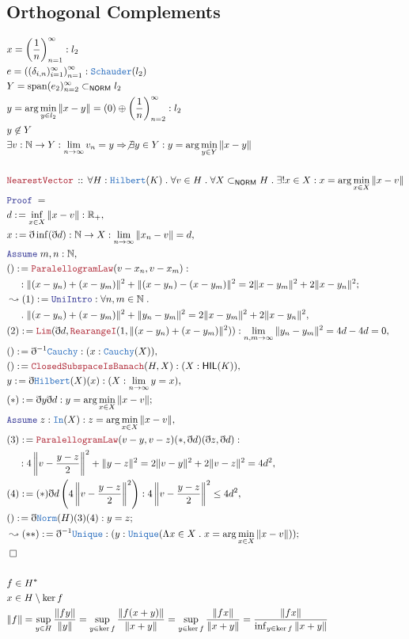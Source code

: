 \documentclass[12pt]{scrartcl}
\newcommand{\TYPE}[1]{\textcolor{NavyBlue}{\mathtt{#1}}}
\newcommand{\LOGIC}[1]{\textcolor{Blue}{\mathtt{#1}}}
\newcommand{\THM}[1]{\textcolor{Maroon}{\mathtt{#1}}}
\renewcommand{\.}{\; . \;}
\newcommand{\de}{: \kern 0.1pc =}
\newcommand{\Theorem}[2]{& \THM{#1} \, :: \, #2 \\ & \Proof = \\ }
\newcommand{\NewLine}{\\ & \kern 1pc}
\newcommand{\Page}[1]{\begin{align*} #1 \end{align*} \newpage   }
\newcommand{ \bd }{ \ByDef }
\newcommand{\Reals}{\mathbb{R} }
\newcommand{\Nat}{\mathbb{N} }
\newcommand{\Say}[3]{& #1 \de #2 : #3, \\}
\newcommand{\Conclude}[3]{& #1 \de #2 : #3; \\}
\newcommand{\Derive}[3]{& \leadsto #1 \de #2 : #3, \\}
\newcommand{\DeriveConclude}[3]{& \leadsto #1 \de #2 : #3 ; \\}
\newcommand{\A}{\LOGIC{Assume} \;}
\newcommand{\Assume}[2]{& \A #1 : #2, \\}
\newcommand{\QED}{\; \square}
\newcommand{\EndProof}{& \QED \\}
\newcommand{\ByDef}{\eth}
\newcommand{\Proof}{\LOGIC{Proof} \; }
\DeclareMathOperator{\Span}{span}
\newcommand{\Hilbert}{\TYPE{Hilbert}}
\newcommand{\NORM}{\textsf{NORM}}
\newcommand{\HIL}{\textsf{HIL}}
\begin{document}
\subsection{Orthogonal Complements}
\Page{
& x = \left( \frac{1}{n} \right)^\infty_{n = 1} : l_2 \\
& e = \left(  (\delta_{i,n} )^\infty_{i = 1}  \right)^\infty_{n = 1} : \TYPE{Schauder}(l_2) \\
& Y = \Span( e_2 )^\infty_{n = 2}  \subset_\NORM l_2 \\
& y = \arg \min_{y \in l_2} \| x - y \| = (0) \oplus \left(  \frac{1}{n} \right)_{n = 2}^\infty : l_2  \\
& y \not \in Y \\
& \exists v : \Nat \to Y : \lim_{n \to \infty} v_n  = y 
\Rightarrow 
\not \exists y \in Y : y = \arg \min_{y \in Y} \| x - y \|
\\ 
\\
\Theorem{NearestVector}{\forall H : \Hilbert(K) \. \forall v \in H \. \forall X \subset_{\NORM} 
H \. \exists! x \in X : x = \arg \min_{x \in X}  \| x - v \|
}
\Say{d}{\inf_{x \in X} \| x - v \| }{\Reals_+}
\Say{x}{\bd \inf(\bd d) }{ \Nat \to X : \lim_{n \to \infty} \| x_n - v \| = d }
\Assume{m,n}{\Nat}
\Conclude{()}{\THM{ParalellogramLaw}(v - x_n,v - x_m)}{ \NewLine :
\| (x - y_n) + (x - y_m)   \|^2 + \| (x - y_n) - (x - y_m)   \|^2 =
2\| x - y_m \|^2 + 2\| x - y_n \|^2 
}
\Derive{(1)}{\LOGIC{UniIntro}}{\forall n, m \in \Nat \.
\NewLine \.
 \| (x - y_n) + (x - y_m)   \|^2 + \|  y_n -  y_m   \|^2 =
2\| x - y_m \|^2 + 2\| x - y_n \|^2}
\Say{(2)}{\THM{Lim}(\bd d, \THM{RearangeI}(1,\| (x - y_n) + (x - y_m)   \|^2))}{\lim_{n,m \to \infty} \| y_n - y_m \|^2 = 4d - 4d = 0 }
\Say{()}{\bd^{-1} \TYPE{Cauchy}}{(x : \TYPE{Cauchy}(X))}
\Say{()}{\THM{ClosedSubspaceIsBanach}(H,X)}{(X : \HIL(K))}
\Say{y}{\bd \Hilbert(X)(x)}{(X : \lim_{n \to \infty} y = x)}
\Conclude{(*)}{\bd y \bd d}{ y = \arg \min_{x \in X}  \| x - v \| }
\Assume{z}{\TYPE{In}(X) : z = \arg \min_{x \in X}  \| x - v \| }
\Say{(3)}{\THM{ParalellogramLaw}( v - y,v - z)(*,\bd d)(\bd z, \bd d)}{
\NewLine :
4\left\|  v - \frac{y - z}{2} \right\|^2 + \| y - z \|^2 = 2\| v - y\|^2 + 2\| v - z \|^2 = 4d^2
}
\Say{(4)}{(*)\bd d\left(  4\left\|  v - \frac{y - z}{2} \right\|^2  \right)}{
4\left\|  v - \frac{y - z}{2} \right\|^2  \le 4d^2}
\Conclude{()}{\bd \TYPE{Norm}(H)(3)(4)}{ y = z}
\DeriveConclude{(**)}{\bd^{-1} \TYPE{Unique}}{(y : \TYPE{Unique}(\Lambda x \in X \.  x = \arg \min_{x \in X}  \| x - v \|))}
\EndProof
\\
&  f \in H^* \\
&  x  \in H \setminus \ker f             \\
& \|  f \| = \sup_{y \in H} \frac{\| f y \|}{\| y \|} = 
\sup_{y \in \ker f} \frac{\| f(x + y) \|}{\| x + y\|} =
\sup_{y \in \ker f} \frac{ \| fx \|}{\| x + y\|} = \frac{\| fx \|}{\inf_{y \in \ker f } \| x + y \|}
}
\end{document}
